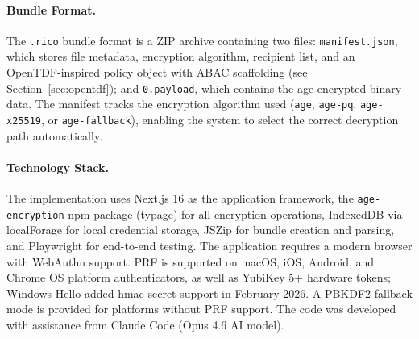 \begin{centeredfigurepairpage}
\par\vspace{2\baselineskip}
\end{centeredfigurepairpage}

\paragraph{Bundle Format.} The \texttt{.rico} bundle format is a ZIP archive containing two files: \texttt{manifest.json}, which stores file metadata, encryption algorithm, recipient list, and an OpenTDF-inspired policy object with ABAC scaffolding (see Section~\ref{sec:opentdf}); and \texttt{0.payload}, which contains the age-encrypted binary data. The manifest tracks the encryption algorithm used (\texttt{age}, \texttt{age-pq}, \texttt{age-x25519}, or \texttt{age-fallback}), enabling the system to select the correct decryption path automatically.

\paragraph{Technology Stack.} The implementation uses Next.js 16 as the application framework, the \texttt{age-encryption} npm package (typage) for all encryption operations, IndexedDB via localForage for local credential storage, JSZip for bundle creation and parsing, and Playwright\texttrademark{} for end-to-end testing. The application requires a modern browser with WebAuthn support. PRF is supported on macOS, iOS, Android, and Chrome OS platform authenticators, as well as YubiKey 5+ hardware tokens; Windows Hello added hmac-secret support in February 2026. A PBKDF2 fallback mode is provided for platforms without PRF support. The code was developed with assistance from Claude Code (Opus 4.6 AI model).

